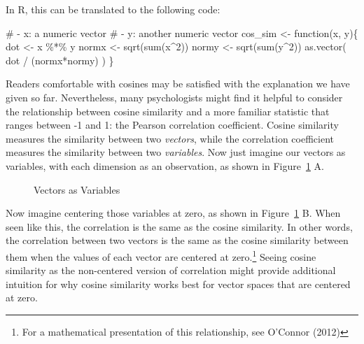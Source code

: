 \documentclass[
  man,
  floatsintext,
  longtable,
  nolmodern,
  notxfonts,
  notimes,
  colorlinks=true,linkcolor=blue,citecolor=blue,urlcolor=blue]{apa7}
\newenvironment{Shaded}{\begin{snugshade}}{\end{snugshade}}
\newcommand{\CommentTok}[1]{\textcolor[rgb]{0.37,0.37,0.37}{#1}}
\newcommand{\ControlFlowTok}[1]{\textcolor[rgb]{0.00,0.23,0.31}{#1}}
\newcommand{\DecValTok}[1]{\textcolor[rgb]{0.68,0.00,0.00}{#1}}
\newcommand{\FunctionTok}[1]{\textcolor[rgb]{0.28,0.35,0.67}{#1}}
\newcommand{\NormalTok}[1]{\textcolor[rgb]{0.00,0.23,0.31}{#1}}
\newcommand{\OtherTok}[1]{\textcolor[rgb]{0.00,0.23,0.31}{#1}}
\newcommand{\SpecialCharTok}[1]{\textcolor[rgb]{0.37,0.37,0.37}{#1}}
\begin{document}
In R, this can be translated to the following code:

\begin{Shaded}
\begin{Highlighting}[]
\CommentTok{\#  {-} \textasciigrave{}x\textasciigrave{}: a numeric vector}
\CommentTok{\#  {-} \textasciigrave{}y\textasciigrave{}: another numeric vector}
\NormalTok{cos\_sim }\OtherTok{\textless{}{-}} \ControlFlowTok{function}\NormalTok{(x, y)\{}
\NormalTok{  dot }\OtherTok{\textless{}{-}}\NormalTok{ x }\SpecialCharTok{\%*\%}\NormalTok{ y}
\NormalTok{  normx }\OtherTok{\textless{}{-}} \FunctionTok{sqrt}\NormalTok{(}\FunctionTok{sum}\NormalTok{(x}\SpecialCharTok{\^{}}\DecValTok{2}\NormalTok{))}
\NormalTok{  normy }\OtherTok{\textless{}{-}} \FunctionTok{sqrt}\NormalTok{(}\FunctionTok{sum}\NormalTok{(y}\SpecialCharTok{\^{}}\DecValTok{2}\NormalTok{))}
  \FunctionTok{as.vector}\NormalTok{( dot }\SpecialCharTok{/}\NormalTok{ (normx}\SpecialCharTok{*}\NormalTok{normy) )}
\NormalTok{\}}
\end{Highlighting}
\end{Shaded}

Readers comfortable with cosines may be satisfied with the explanation
we have given so far. Nevertheless, many psychologists might find it
helpful to consider the relationship between cosine similarity and a
more familiar statistic that ranges between -1 and 1: the Pearson
correlation coefficient. Cosine similarity measures the similarity
between two \emph{vectors}, while the correlation coefficient measures
the similarity between two \emph{variables}. Now just imagine our
vectors as variables, with each dimension as an observation, as shown in
Figure~\ref{fig-cosineintuition} A.

\begin{figure}

\caption{\label{fig-cosineintuition}Vectors as Variables}


\end{figure}%

Now imagine centering those variables at zero, as shown in
Figure~\ref{fig-cosineintuition} B. When seen like this, the correlation
is the same as the cosine similarity. In other words, the correlation
between two vectors is the same as the cosine similarity between them
when the values of each vector are centered at zero.\footnote{For a
  mathematical presentation of this relationship, see O'Connor (2012)}
Seeing cosine similarity as the non-centered version of correlation
might provide additional intuition for why cosine similarity works best
for vector spaces that are centered at zero.
\end{document}
